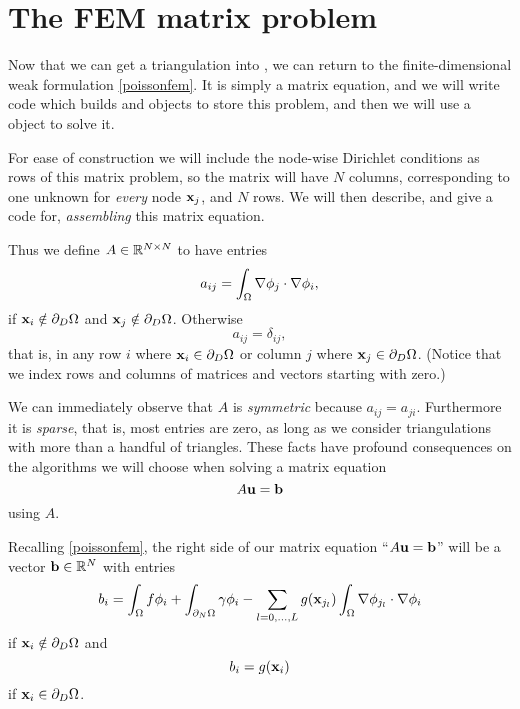 \section{The FEM matrix problem}

Now that we can get a triangulation into \PETSc, we can return to the finite-dimensional weak formulation \eqref{poissonfem}.  It is simply a matrix equation, and we will write code which builds \PETSc \pMat and \pVec objects to store this problem, and then we will use a \PETSc \pKSP object to solve it.

For ease of construction we will include the node-wise Dirichlet conditions as rows of this matrix problem, so the matrix will have $N$ columns, corresponding to one unknown for \emph{every} node $\mathbf{x}_j$, and $N$ rows.  We will then describe, and give a code for, \emph{assembling} this matrix equation.

Thus we define $A \in \mathbb{R}^{N\times N}$ to have entries
\begin{equation*}
a_{ij} = \int_\Omega \nabla \phi_j \cdot \nabla \phi_i,
\end{equation*}
if $\mathbf{x}_i \notin \partial_D \Omega$ and $\mathbf{x}_j \notin \partial_D \Omega$.  Otherwise
\begin{equation*}
a_{ij} = \delta_{ij},
\end{equation*}
that is, in any row $i$ where $\mathbf{x}_i \in \partial_D \Omega$ or column $j$ where $\mathbf{x}_j \in \partial_D \Omega$.  (Notice that we index rows and columns of matrices and vectors starting with zero.)

We can immediately observe that $A$ is \emph{symmetric} because $a_{ij}=a_{ji}$.  Furthermore it is \emph{sparse}, that is, most entries are zero, as long as we consider triangulations with more than a handful of triangles.  These facts have profound consequences on the algorithms we will choose when solving a matrix equation
\begin{equation}
A \mathbf{u} = \mathbf{b} \label{poissonmatrix}
\end{equation}
using $A$.

Recalling \eqref{poissonfem}, the right side of our matrix equation ``$A \mathbf{u} = \mathbf{b}$'' will be a vector $\mathbf{b}\in\mathbb{R}^N$ with entries
    $$b_i = \int_\Omega f \phi_i + \int_{\partial_N\Omega} \gamma \phi_i - \sum_{l=0,\dots,L} g(\mathbf{x}_{j_l})  \int_\Omega \nabla \phi_{j_l} \cdot \nabla \phi_i$$
if $\mathbf{x}_i \notin \partial_D \Omega$ and
    $$b_i = g(\mathbf{x}_{i})$$
if $\mathbf{x}_i \in \partial_D \Omega$.

